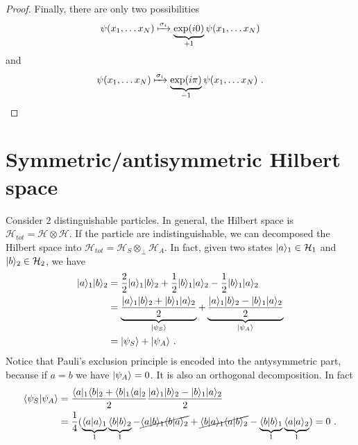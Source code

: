 \begin{proof}
        Finally, there are only two possibilities 
        \begin{equation*}
            \psi(x_1, \ldots x_N) \xmapsto{\sigma_i} \underbrace{\exp(i 0)}_{+1} \psi(x_1, \ldots x_N)
        \end{equation*}
        and 
        \begin{equation*}
            \psi(x_1, \ldots x_N) \xmapsto{\sigma_i} \underbrace{\exp(i \pi)}_{-1} \psi(x_1, \ldots x_N) ~.
        \end{equation*}
    \end{proof}

\section{Symmetric/antisymmetric Hilbert space} 

    Consider $2$ distinguishable particles. In general, the Hilbert space is $\mathcal H_{tot} = \mathcal H \otimes \mathcal H$. If the particle are indistinguishable, we can decomposed the Hilbert space into $\mathcal H_{tot} = \mathcal H_S \otimes_\perp  \mathcal H_A$. In fact, given two states $\vert a\rangle_1 \in \mathcal H_1$ and $\vert b\rangle_2 \in \mathcal H_2$, we have 
    \begin{equation*}
    \begin{aligned}
        \vert a\rangle_1\vert b\rangle_2 & = \frac{2}{2} \vert a\rangle_1\vert b\rangle_2 + \frac{1}{2} \vert b\rangle_1\vert a\rangle_2 - \frac{1}{2} \vert b\rangle_1\vert a\rangle_2 \\ & = \underbrace{\frac{\vert a\rangle_1\vert b\rangle_2 + \vert b\rangle_1\vert a\rangle_2}{2}}_{\vert\psi_S\rangle} + \underbrace{\frac{\vert a\rangle_1\vert b\rangle_2 - \vert b\rangle_1\vert a\rangle_2}{2}}_{\vert\psi_A\rangle} \\ & = \vert\psi_S\rangle + \vert\psi_A\rangle ~.
    \end{aligned}
    \end{equation*}
    Notice that Pauli's exclusion principle is encoded into the antysymmetric part, because if $a = b$ we have $\vert\psi_A\rangle = 0$. It is also an orthogonal decomposition. In fact 
    \begin{equation*}
    \begin{aligned}
        \langle\psi_S\vert\psi_A\rangle & = \frac{\langle a\vert_1\langle b\vert_2 + \langle b\vert_1\langle a\vert_2}{2} \frac{\vert a\rangle_1 \vert b\rangle_2 - \vert b\rangle_1 \vert a\rangle_2}{2} \\ & = \frac{1}{4} (\underbrace{\langle a\vert a\rangle_1}_1 \underbrace{\langle b\vert b\rangle_2}_1 - \cancel{\langle a\vert b\rangle_1 \langle b\vert a\rangle_2} + \cancel{\langle b\vert a\rangle_1 \langle a\vert b\rangle_2} - \underbrace{\langle b\vert b\rangle_1}_1 \underbrace{\langle a\vert a\rangle_2}_1 ) = 0 ~. 
    \end{aligned}
    \end{equation*}

